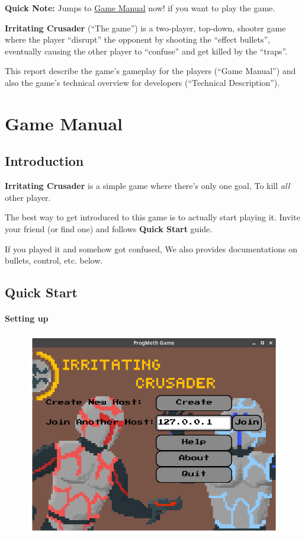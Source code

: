 \documentclass{article}
\begin{document}
\textbf{Quick Note:} Jumps to \protect\hyperlink{game-manual}{Game
Manual} now! if you want to play the game.

\textbf{Irritating Crusader} (``The game'') is a two-player, top-down,
shooter game where the player ``disrupt'' the opponent by shooting the
``effect bullets'', eventually causing the other player to ``confuse''
and get killed by the ``traps''.

This report describe the game's gameplay for the players (``Game
Manual'') and also the game's technical overview for developers
(``Technical Description'').

\hypertarget{game-manual}{%
\section{Game Manual}\label{game-manual}}

\hypertarget{introduction}{%
\subsection{Introduction}\label{introduction}}

\textbf{Irritating Crusader} is a simple game where there's only one
goal, To kill \emph{all} other player.

The best way to get introduced to this game is to actually start playing
it. Invite your friend (or find one) and follows \textbf{Quick Start}
guide.

If you played it and somehow got confused, We also provides
documentations on bullets, control, etc. below.

\hypertarget{quick-start}{%
\subsection{Quick Start}\label{quick-start}}

\hypertarget{setting-up}{%
\paragraph{Setting up}\label{setting-up}}

\begin{figure}
	\includegraphics[width=\linewidth]{docasset/welcome}
\end{figure}
\end{document}
